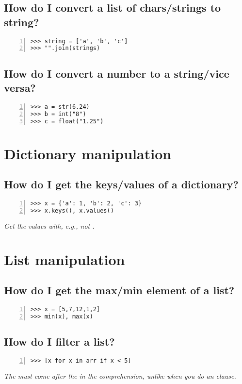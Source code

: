 \documentclass[12pt]{article}
\begin{document}
\subsection{How do I convert a list of chars/strings to string?}
\begin{lstlisting}[numbers=left]
>>> string = ['a', 'b', 'c']
>>> "".join(strings)
\end{lstlisting}

\subsection{How do I convert a number to a string/vice versa?}
\begin{lstlisting}[numbers=left]
>>> a = str(6.24)
>>> b = int("8")
>>> c = float("1.25")
\end{lstlisting}

\section{Dictionary manipulation}
\subsection{How do I get the keys/values of a dictionary?}
\begin{lstlisting}[numbers=left]
>>> x = {'a': 1, 'b': 2, 'c': 3}
>>> x.keys(), x.values()
\end{lstlisting}
\emph{Get the values with, e.g.,  not .}

\section{List manipulation}
\subsection{How do I get the max/min element of a list?}
\begin{lstlisting}[numbers=left]
>>> x = [5,7,12,1,2]
>>> min(x), max(x)
\end{lstlisting}

\subsection{How do I filter a list?}
\begin{lstlisting}[numbers=left]
>>> [x for x in arr if x < 5]
\end{lstlisting}
\emph{The  must come after the  in the comprehension, unlike when you do an  clause.}
\end{document}
